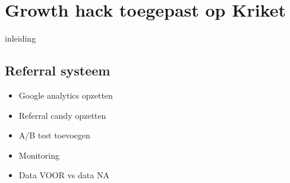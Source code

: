 
\chapter{Growth hack toegepast op Kriket}
\label{ch:implementatie}

inleiding

\section{Referral systeem}
\label{sec:referral-systeem}
\begin{itemize}
	\item Google analytics opzetten
	\item Referral candy opzetten
	\item A/B test toevoegen
	\item Monitoring
	\item Data VOOR vs data NA
\end{itemize}